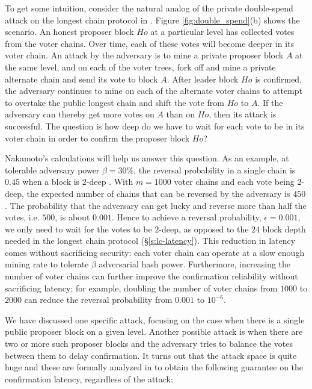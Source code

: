 To get some intuition, consider the natural analog of the private double-spend attack on the longest chain protocol in \prism. Figure \ref{fig:double_spend}(b) shows the scenario. An honest proposer block $Ho$ at a particular level has collected votes from the voter chains. Over time, each of these votes will become deeper in its voter chain. An attack by the adversary is to mine a private proposer block $A$ at the same level, and on each of the voter trees, fork off and mine a private alternate chain and send its vote to block $A$. After leader block $Ho$ is confirmed, the adversary continues to mine on each of the alternate voter chains to attempt to overtake the public longest chain and shift the vote from $Ho$ to $A$. If the adversary can thereby get more votes on $A$ than on $Ho$, then its attack is successful. The question is how deep do we have to wait for each vote to be in its voter chain in order to confirm the proposer block $Ho$?

Nakamoto's calculations will help us answer this question. As an example, at tolerable adversary power $\beta = 30\%$, the reversal probability in a single chain is $0.45$ when a block is $2$-deep \cite{bitcoin}. With $m=1000$ voter chains and each vote being $2$-deep, the expected number of chains that can be reversed by the adversary is $450$. The probability that the adversary can get lucky and reverse more than half the votes, i.e. $500$, is about  $0.001$. Hence to achieve a reversal probability, $\epsilon = 0.001$, we only need to wait for the votes to be  $2$-deep, as opposed to the $24$ block depth needed in the longest chain protocol (\S\ref{s:lc-latency}). This reduction in latency comes without sacrificing security: each voter chain can operate at a slow enough mining rate to tolerate $\beta$ adversarial hash power. Furthermore, increasing the number of voter chains can further improve the confirmation reliability without sacrificing latency; for example, doubling the number of voter chains from $1000$ to $2000$ can reduce the reversal probability from $0.001$ to $10^{-6}$.

We have discussed one specific attack, focusing on the case when there is a single public proposer block on a given level. Another possible attack is when there are two or more such proposer blocks and the adversary tries to balance the votes between them to delay confirmation. It turns out that the attack space is quite huge and these are formally analyzed in \cite{prism-theory} to obtain the following guarantee on the confirmation latency, regardless of the attack:

